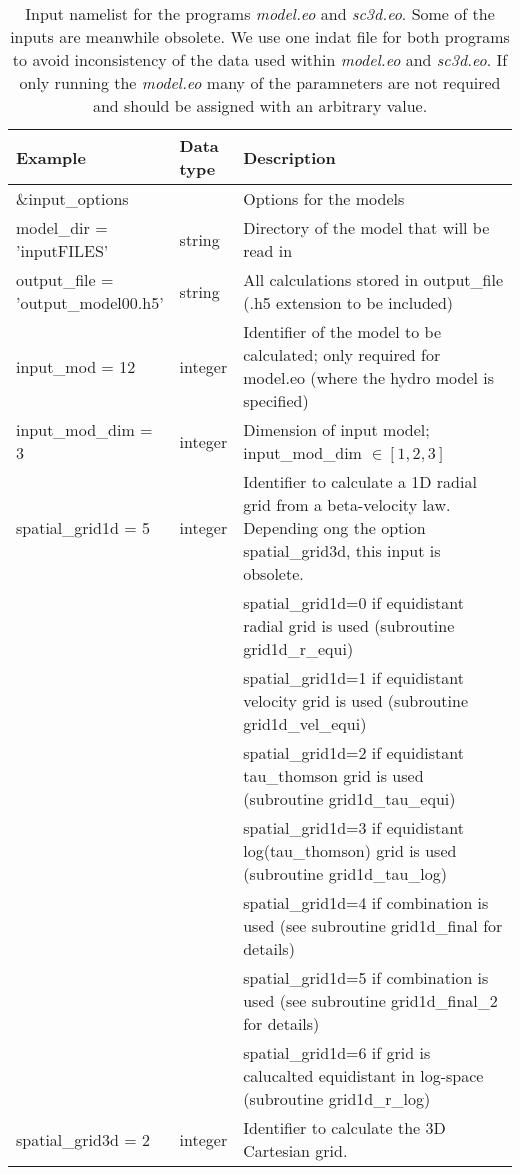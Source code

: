 \documentclass[10pt,a4paper]{article}
\begin{document}
\begin{footnotesize}
\begin{longtable}[h]{p{0.24\linewidth}p{0.07\linewidth}p{0.69\linewidth}}
\caption{\normalsize Input namelist for the programs \textit{model.eo} and
  \textit{sc3d.eo}. Some of the inputs are meanwhile obsolete. We use one indat file for both programs to avoid inconsistency of the data used within \textit{model.eo} and \textit{sc3d.eo}. If only running the \textit{model.eo} many of the paramneters are not required and should be assigned with an arbitrary value.}
\label{tab:namelist_sc3d}
\\\hline\hline
 Example & Data type & Description \\\hline
  \&input\_options & & Options for the models \\
model\_dir = 'inputFILES' & string & Directory of the model that will be read in \\
output\_file = 'output\_model00.h5' & string & All calculations stored in output\_file (.h5 extension to be included) \\
input\_mod = 12 & integer & Identifier of the model to be calculated; only required for model.eo (where the hydro model is specified)\\
input\_mod\_dim = 3 & integer & Dimension of input model; input\_mod\_dim $\in [1,2,3]$ \\
%
spatial\_grid1d = 5 & integer & Identifier to calculate a 1D radial grid from a beta-velocity law. Depending ong the option spatial\_grid3d, this input is obsolete.\\
 & & spatial\_grid1d=0 if equidistant radial grid is used (subroutine grid1d\_r\_equi) \\
 & & spatial\_grid1d=1 if equidistant velocity grid is used (subroutine grid1d\_vel\_equi) \\
 & & spatial\_grid1d=2 if equidistant tau\_thomson grid is used (subroutine grid1d\_tau\_equi) \\
 & & spatial\_grid1d=3 if equidistant log(tau\_thomson) grid is used (subroutine grid1d\_tau\_log) \\
 & & spatial\_grid1d=4 if combination is used (see subroutine grid1d\_final for details) \\
 & & spatial\_grid1d=5 if combination is used (see subroutine grid1d\_final\_2 for details) \\
 & & spatial\_grid1d=6 if grid is calucalted equidistant in log-space (subroutine grid1d\_r\_log) \\
%
spatial\_grid3d = 2 & integer & Identifier to calculate the 3D Cartesian grid. \\

\end{longtable}
\end{footnotesize}
\end{document}
